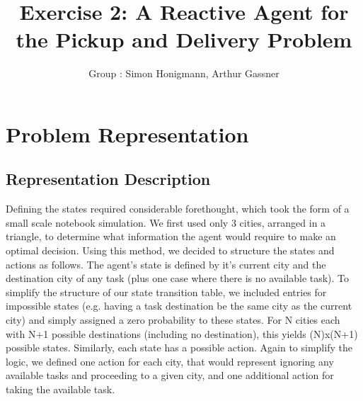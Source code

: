 \documentclass[11pt]{article}
\title{\bf Exercise 2: A Reactive Agent for the Pickup and Delivery Problem}
\author{Group \textnumero76: Simon Honigmann, Arthur Gassner}
\begin{document}
\maketitle
\section{Problem Representation}

\subsection{Representation Description}

Defining the states required considerable forethought, which took the form of a small scale notebook simulation. We first used only 3 cities, arranged in a triangle, to determine what information the agent would require to make an optimal decision. Using this method, we decided to structure the states and actions as follows. The agent's state is defined by it's current city and the destination city of any task (plus one case where there is no available task). To simplify the structure of our state transition table, we included entries for impossible states (e.g. having a task destination be the same city as the current city) and simply assigned a zero probability to these states. For N cities each with N+1 possible destinations (including no destination), this yields (N)x(N+1) possible states. Similarly, each state has a possible action. Again to simplify the logic, we defined one action for each city, that would represent ignoring any available tasks and proceeding to a given city, and one additional action for taking the available task.\\
\end{document}
